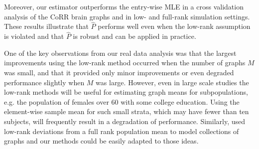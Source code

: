 \documentclass[10pt,letterpaper]{article}
\renewcommand{\hat}{\widehat}
\begin{document}
Moreover, our estimator outperforms the entry-wise MLE in a cross validation analysis of the CoRR brain graphs and in low- and full-rank simulation settings.
These results illustrate that $\hat{P}$ performs well even when the low-rank assumption is violated and that $\hat{P}$ is robust and can be applied in practice.

One of the key observations from our real data analysis was that the largest improvements using the low-rank method occurred when the number of graphs $M$ was small, and that it provided only minor improvements or even degraded performance slightly when $M$ was large. 
However, even in large scale studies the low-rank methods will be useful for estimating graph means for subpopulations, e.g. the population of females over 60 with some college education.
Using the element-wise sample mean for such small strata, which may have fewer than ten subjects, will frequently result in a degradation of performance.
Similarly, \citet{durante2014nonparametric} used low-rank deviations from a full rank population mean to model collections of graphs and our methods could be easily adapted to those ideas.






\end{document}
